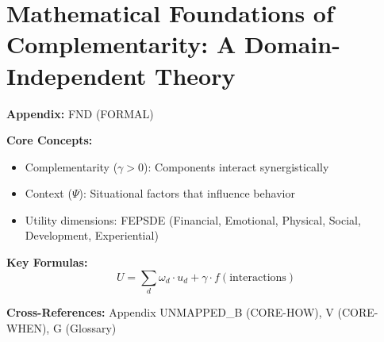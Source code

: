 
\chapter{Mathematical Foundations of Complementarity: A Domain-Independent Theory}
\label{app:formal-found}

\begin{abstract}
This appendix presents the key concepts and formalizations for Mathematical Foundations of Complementarity: A Domain-Independent Theory.
It provides theoretical foundations, practical applications, and integration
points with other components of the Evidence-Based Framework (EBF).
The content supports decision-making and behavioral analysis in the context
of complementarity and context-dependent outcomes.
\end{abstract}

\begin{tcolorbox}[colback=blue!5!white, colframe=blue!75!black,
    title=Quick Reference: Mathematical Foundations of Complementarity: A Domain-Independent Theory]

\textbf{Appendix:} FND (FORMAL)

\textbf{Core Concepts:}
\begin{itemize}[nosep]
\item Complementarity ($\gamma > 0$): Components interact synergistically
\item Context ($\Psi$): Situational factors that influence behavior
\item Utility dimensions: FEPSDE (Financial, Emotional, Physical, Social, Development, Experiential)
\end{itemize}

\textbf{Key Formulas:}
\begin{equation}
U = \sum_d \omega_d \cdot u_d + \gamma \cdot f(\text{interactions})
\end{equation}

\textbf{Cross-References:} Appendix UNMAPPED_B (CORE-HOW), V (CORE-WHEN), G (Glossary)
\end{tcolorbox}





